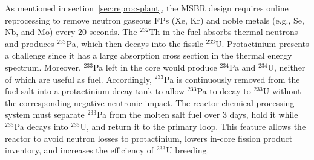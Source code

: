 As mentioned in section~\ref{sec:reproc-plant}, the \gls{MSBR} design 
requires online reprocessing to remove neutron gaseous \glspl{FP} (Xe, Kr) and 
noble metals (e.g., Se, Nb, and Mo) every 20 seconds.  The $^{232}$Th in the 
fuel absorbs thermal neutrons and produces $^{233}$Pa, which then decays into 
the fissile $^{233}$U. Protactinium presents a challenge since it has a large 
absorption cross section in the thermal energy spectrum. Moreover, $^{233}$Pa 
left in the core would produce $^{234}$Pa and $^{234}$U, neither of which are 
useful as fuel. Accordingly, $^{233}$Pa is continuously removed from the fuel 
salt into a protactinium decay tank to allow $^{233}$Pa to decay to $^{233}$U 
without the corresponding negative neutronic impact. The reactor chemical 
processing system must separate $^{233}$Pa from the molten salt fuel over 3 
days, hold it while $^{233}$Pa decays into $^{233}$U, and return it to 
the primary loop. This feature allows the reactor to avoid neutron losses to 
protactinium, lowers in-core fission product inventory, and increases the 
efficiency of $^{233}$U breeding.

